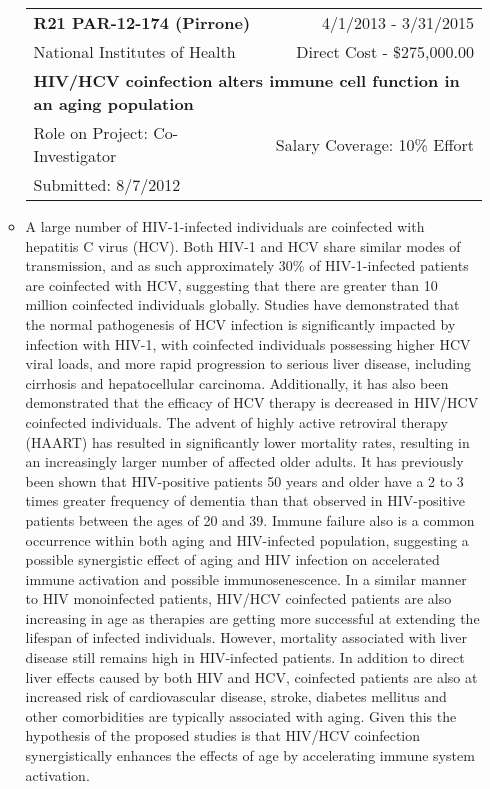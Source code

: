 \documentclass[a4paper,11pt]{article}
\makeatletter
\newenvironment{fullwidth}
    {\par
     \setlength{\@totalleftmargin}{0pt}%
     \setlength{\linewidth}{\hsize}%
     \list{}{\setlength{\leftmargin}{0pt}}
     \item\relax}
    {\endlist}
\makeatother
\begin{document}
\begin{enumerate}
\begin{itemize}
   \begin{longtable}{lr}
    \textbf{R21 PAR-12-174 (Pirrone)} & 4/1/2013 - 3/31/2015 \\
    National Institutes of Health & Direct Cost - \$275,000.00 \\
    \multicolumn{2}{p{0.973\textwidth}}{\bfseries HIV/HCV coinfection alters immune cell function in an aging population } \\
    Role on Project:  Co-Investigator & Salary Coverage: 10\% Effort\\
    Submitted: 8/7/2012\\
    \end{longtable}
   \begin{fullwidth}
    A large number of HIV-1-infected individuals are coinfected with hepatitis C virus (HCV). 
Both HIV-1 and HCV share similar modes of transmission, and as such approximately 30\% of HIV-1-infected patients are coinfected with HCV, suggesting that there are greater than 10 million coinfected individuals globally. 
Studies have demonstrated that the normal pathogenesis of HCV infection is significantly impacted by infection with HIV-1, with coinfected individuals possessing higher HCV viral loads, and more rapid progression to serious liver disease, including cirrhosis and hepatocellular carcinoma. 
Additionally, it has also been demonstrated that the efficacy of HCV therapy is decreased in HIV/HCV coinfected individuals. 
The advent of highly active retroviral therapy (HAART) has resulted in significantly lower mortality rates, resulting in an increasingly larger number of affected older adults. 
It has previously been shown that HIV-positive patients 50 years and older have a 2 to 3 times greater frequency of dementia than that observed in HIV-positive patients between the ages of 20 and 39. 
Immune failure also is a common occurrence within both aging and HIV-infected population, suggesting a possible synergistic effect of aging and HIV infection on accelerated immune activation and possible immunosenescence. 
In a similar manner to HIV monoinfected patients, HIV/HCV coinfected patients are also increasing in age as therapies are getting more successful at extending the lifespan of infected individuals. 
However, mortality associated with liver disease still remains high in HIV-infected patients. 
In addition to direct liver effects caused by both HIV and HCV, coinfected patients are also at increased risk of cardiovascular disease, stroke, diabetes mellitus and other comorbidities are typically associated with aging. 
Given this the hypothesis of the proposed studies is that HIV/HCV coinfection synergistically enhances the effects of age by accelerating immune system activation. 

\end{fullwidth}
\end{itemize}
\end{enumerate}
\end{document}

